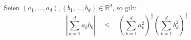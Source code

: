 Seien $(a_1, \dots, a_d), (b_1, \dots, b_d) \in \mathbb{R}^d$, so gilt:
$$
\left| \sum_{k=1}^d a_k b_k \right| 
\quad \leq \quad
\left( \sum_{k=1}^d a_k^2 \right)^\frac{1}{2}
\left( \sum_{k=1}^d b_k^2 \right)^\frac{1}{2}
$$